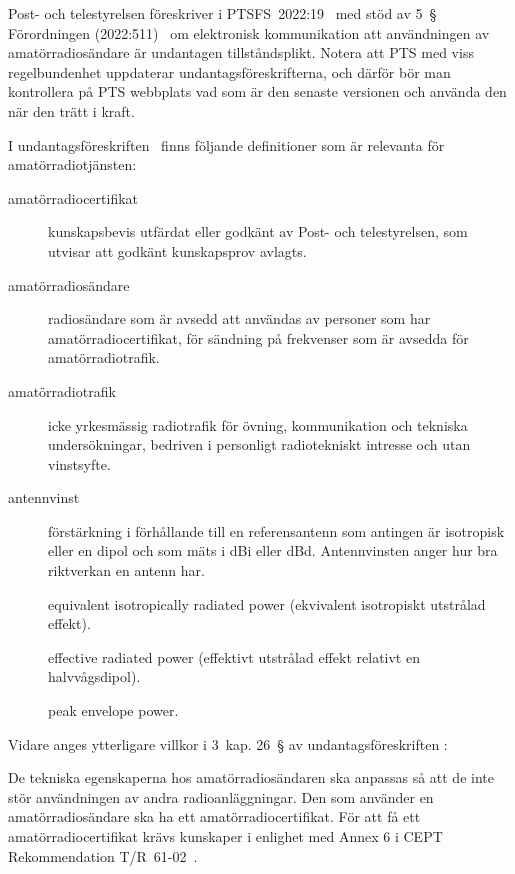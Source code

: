 Post- och telestyrelsen föreskriver i PTSFS~2022:19~\cite{PTSFS2022:19} med stöd
av 5~\S{} Förordningen (2022:511)~\cite{SFS2022:511} om elektronisk kommunikation
att användningen av amatörradiosändare är undantagen tillståndsplikt.
Notera att PTS med viss regelbundenhet uppdaterar undantagsföreskrifterna,
och därför bör man kontrollera på PTS webbplats vad som är den senaste versionen
och använda den när den trätt i kraft.

I undantagsföreskriften~\cite{PTSFS2022:19} finns följande definitioner som är
relevanta för amatörradiotjänsten:

\begin{description}
\item[amatörradiocertifikat] kunskapsbevis utfärdat eller godkänt av
Post- och telestyrelsen, som utvisar att godkänt kunskapsprov avlagts.

\item[amatörradiosändare] radiosändare som är avsedd att användas av personer
som har amatörradiocertifikat, för sändning på frekvenser som är avsedda för
amatörradiotrafik.

\item[amatörradiotrafik] icke yrkesmässig radiotrafik för övning,
kommunikation och tekniska undersökningar, bedriven i personligt radiotekniskt
intresse och utan vinstsyfte.

\item[antennvinst] förstärkning i förhållande till en referensantenn som
antingen är isotropisk eller en dipol och som mäts i dBi eller dBd.
Antennvinsten anger hur bra riktverkan en antenn har.

\item[\eirp] equivalent isotropically radiated power (ekvivalent
isotropiskt utstrålad effekt).

\item[\erp] effective radiated power (effektivt utstrålad effekt relativt en
halvvågsdipol).

\item[\pep] peak envelope power.
\end{description}
Vidare anges ytterligare villkor i 3~kap. 26~\S{} av undantagsföreskriften
\cite{PTSFS2022:19}:

De tekniska egenskaperna hos amatörradiosändaren ska anpassas så att de inte
stör användningen av andra radioanläggningar.
Den som använder en amatörradiosändare ska ha ett amatörradiocertifikat.
För att få ett amatörradiocertifikat krävs kunskaper i enlighet med Annex 6 i
CEPT Rekommendation T/R~61-02~\cite{TR6102}.

